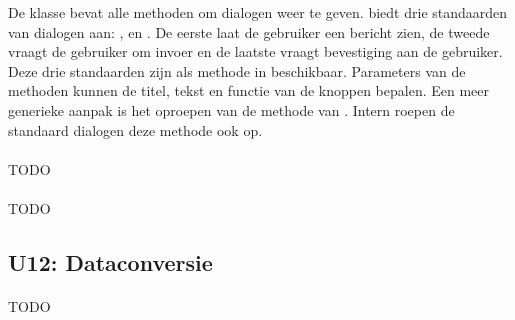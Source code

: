 De   klasse bevat alle methoden om dialogen weer te geven.
\st{} biedt drie standaarden van dialogen aan: ,  en .
De eerste laat de gebruiker een bericht zien,  de tweede vraagt de gebruiker om invoer en de laatste vraagt bevestiging aan de gebruiker.
Deze drie standaarden zijn als methode in  beschikbaar.
Parameters van de methoden kunnen de titel, tekst en functie van de knoppen bepalen.
Een meer generieke aanpak is het oproepen van de  methode van .
Intern roepen de standaard dialogen deze methode ook op.

\paragraph{\kendo}
TODO

\paragraph{\lungo}
TODO

\begin{table}[H]
\centering
{}
\caption{Scores voor U11: Laadscherm en dialoogvenster}
\label{tabel:evaluatie-gebruik-u11}
\end{table}

\subsection{U12: Dataconversie}

\paragraph{\jqm}
TODO


